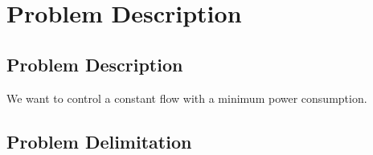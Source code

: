 \chapter{Problem Description}\label{ch:probdesc}

\section{Problem Description}
We want to control a constant flow with a minimum power consumption.


\section{Problem Delimitation}
